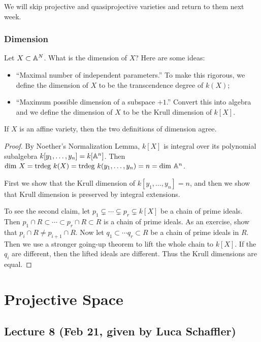 \documentclass[twoside, 10pt]{article}
\begin{document}
    We will skip projective and quasiprojective varieties and return to them next week.

    \subsubsection{Dimension}
    Let $X \subset \mathbb{A}^N$. What is the dimension of $X$? Here are some ideas: \begin{itemize}
        \item ``Maximal number of independent parameters.'' To make this rigorous, we define the dimension of $X$ to be the transcendence degree of $k(X)$;
        \item ``Maximum possible dimension of a subspace $+1$.'' Convert this into algebra and we define the dimension of $X$ to be the Krull dimension of $k[X]$.
    \end{itemize}

    \begin{thm}
        If $X$ is an affine variety, then the two definitions of dimension agree.
        \begin{proof}
            By Noether's Normalization Lemma, $k[X]$ is integral over its polynomial subalgebra $k[y_1, \ldots, y_n] = k[\mathbb{A}^n]$. Then $\mathrm{dim}\ X = \mathrm{trdeg}\ k(X) = \mathrm{trdeg}\ k(y_1, \ldots, y_n) = n = \mathrm{dim}\ \A^n$.

            First we show that the Krull dimension of $k[y_1, \ldots, y_n] = n$, and then we show that Krull dimension is preserved by integral extensions.

            To see the second claim, let $p_1 \subsetneq \cdots \subsetneq p_r \subsetneq k[X]$ be a chain of prime ideals. Then $p_1 \cap R \subset \cdots \subset p_r \cap R \subset R$ is a chain of prime ideals. As an exercise, show that $p_i \cap R \neq p_{i+1} \cap R$. Now let $q_1 \subset \cdots q_r \subset R$ be a chain of prime ideals in $R$. Then we use a stronger going-up theorem to lift the whole chain to $k[X]$. If the $q_i$ are different, then the lifted ideals are different. Thus the Krull dimensions are equal.
        \end{proof}
    \end{thm}

    \section{Projective Space}
    
    \subsection{Lecture 8 (Feb 21, given by Luca Schaffler)}
\end{document}
